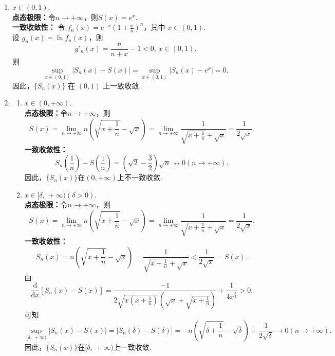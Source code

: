 \begin{enumerate}
\begin{solution}
\begin{enumerate}
        \item 
        $x\in(0,1).$\\
        \textbf{点态极限：}令$n\to+\infty$，则$S(x)=e^x$.\\	
        \textbf{一致收敛性：}
        令 $\displaystyle f_n(x)=e^{-x}\left(1+\frac{x}{n}\right)^n$，其中 $x\in(0,1)$.\\
        设 $\displaystyle g_n(x)=\ln f_n(x)$，则
        \[
        g'_n(x)=\frac{n}{n+x}-1<0,\,x\in(0,1).
        \]
        则
        \[
        \sup_{x\in(0,1)}\left|S_n(x)-S(x)\right|=\sup_{x\in(0,1)}\left|S_n(x)-e^x\right|=0.
        \]
        因此，$\{S_n(x)\}$ 在 $(0,1)$ 上一致收敛.

        \item 
        \begin{enumerate}
        \item[i.] $x\in(0,+\infty).$\\
        \textbf{点态极限：}令$n\to+\infty$，则
        \[
        S(x)=\lim_{n\to+\infty} n\left(\sqrt{x+\frac{1}{n}}-\sqrt{x}\right)=\lim_{n\to+\infty} \frac{1}{\sqrt{x+\frac{1}{n}}+\sqrt{x}}=\frac{1}{2\sqrt{x}}.
        \]	
        \textbf{一致收敛性：}
        \[
        S_n\left(\frac{1}{n}\right)-S\left(\frac{1}{n}\right)=\left(\sqrt{2}-\frac{3}{2}\right)\sqrt{n}\nrightarrow 0(n\to+\infty).
        \]
        因此，$\{S_n(x)\}$在$(0,+\infty)$上不一致收敛.
        \item[ii.] $x\in [\delta,\,+\infty)(\delta >0 ).$\\
        \textbf{点态极限：}令$n\to+\infty$，则
        \[
        S(x)=\lim_{n\to+\infty} n\left(\sqrt{x+\frac{1}{n}}-\sqrt{x}\right)=\lim_{n\to+\infty} \frac{1}{\sqrt{x+\frac{1}{n}}+\sqrt{x}}=\frac{1}{2\sqrt{x}}.
        \]
        \textbf{一致收敛性：}
        \[
        S_n(x)=n\left(\sqrt{x+\frac{1}{n}}-\sqrt{x}\right)=\frac{1}{\sqrt{x+\frac{1}{n}}+\sqrt{x}}<\frac{1}{2\sqrt{x}}=S(x).
        \]
        由
        \[
        \frac{\mathrm{d}}{\mathrm{d}x}\left[S_n(x)-S(x)\right]=\frac{-1}{2\sqrt{x\left(x+\frac{1}{n}\right)}\left(\sqrt{x}+\sqrt{x+\frac{1}{n}}\right)}+\frac{1}{4x^{\frac{3}{2}}}>0.
        \]
        可知
        \[
        \sup_{[\delta,\,+\infty)}\left|S_n(x)-S(x)\right|=\left|S_n(\delta)-S(\delta)\right|=-n\left(\sqrt{\delta+\frac{1}{n}}-\sqrt{\delta}\right)+\frac{1}{2\sqrt{\delta}}\to 0 (n\to+\infty).
        \]
        因此，$\{S_n(x)\}$在$[\delta,\,+\infty)$上一致收敛.
        \end{enumerate}
        \end{enumerate}
    \end{solution}


\end{enumerate}
